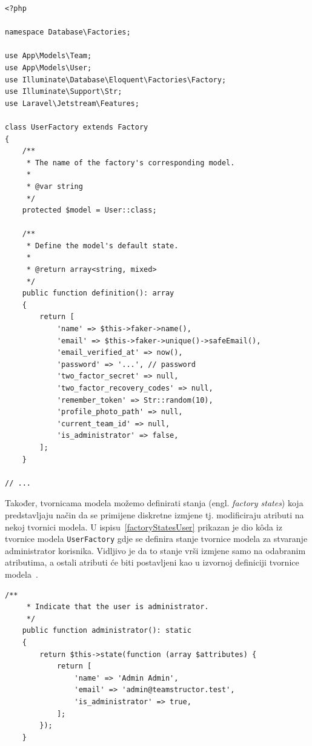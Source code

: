 \begin{lstlisting}[caption={Dio k\^oda tvornice modela \texttt{UserFactory}}, label=factoryUser]
<?php

namespace Database\Factories;

use App\Models\Team;
use App\Models\User;
use Illuminate\Database\Eloquent\Factories\Factory;
use Illuminate\Support\Str;
use Laravel\Jetstream\Features;

class UserFactory extends Factory
{
    /**
     * The name of the factory's corresponding model.
     *
     * @var string
     */
    protected $model = User::class;

    /**
     * Define the model's default state.
     *
     * @return array<string, mixed>
     */
    public function definition(): array
    {
        return [
            'name' => $this->faker->name(),
            'email' => $this->faker->unique()->safeEmail(),
            'email_verified_at' => now(),
            'password' => '...', // password
            'two_factor_secret' => null,
            'two_factor_recovery_codes' => null,
            'remember_token' => Str::random(10),
            'profile_photo_path' => null,
            'current_team_id' => null,
            'is_administrator' => false,
        ];
    }
    
// ...
\end{lstlisting}

Također, tvornicama modela možemo definirati stanja (engl. \textit{factory states}) koja predstavljaju način da se primijene diskretne izmjene tj. modificiraju atributi na nekoj tvornici modela. U ispisu~\ref{factoryStatesUser} prikazan je dio k\^oda iz tvornice modela \texttt{UserFactory} gdje se definira stanje tvornice modela za stvaranje administrator korisnika. Vidljivo je da to stanje vrši izmjene samo na odabranim atributima, a ostali atributi će biti postavljeni kao u izvornoj definiciji tvornice modela~\cite{factories}.

\begin{lstlisting}[caption={Dio k\^oda tvornice modela \texttt{UserFactory} koji prikazuje definiciju stanja tvornice modela}, label=factoryStatesUser]
    /**
     * Indicate that the user is administrator.
     */
    public function administrator(): static
    {
        return $this->state(function (array $attributes) {
            return [
                'name' => 'Admin Admin',
                'email' => 'admin@teamstructor.test',
                'is_administrator' => true,
            ];
        });
    }
\end{lstlisting}

